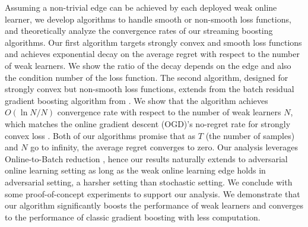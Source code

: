 Assuming a non-trivial edge can be achieved by each deployed weak online learner, we develop algorithms to handle smooth or non-smooth loss functions, and theoretically analyze the convergence rates of our streaming boosting algorithms. Our first algorithm targets strongly convex and smooth loss functions and achieves exponential decay on the average regret with respect to the number of weak learners. We show the ratio of the decay depends on the edge and also the condition number of the loss function. The second algorithm, designed for strongly convex but non-smooth loss functions, extends from the batch residual gradient boosting algorithm from \citep{grubb2011generalized}. We show that the algorithm achieves $O(\ln N/N)$ convergence rate with respect to the number of weak learners $N$, which matches the online gradient descent (OGD)'s no-regret rate for strongly convex loss \citep{hazan2007logarithmic}.  Both of our algorithms promise that as $T$ (the number of samples) and $N$ go to infinity, the average regret converges to zero. Our analysis leverages Online-to-Batch reduction \citep{cesa2004generalization,JMLR:v15:hazan14a}, hence our results naturally extends to adversarial online learning setting as long as the weak online learning edge holds in adversarial setting, a harsher setting than stochastic setting. We conclude with some proof-of-concept experiments to support our analysis. We demonstrate that our algorithm significantly boosts the performance of weak learners and converges to the performance of classic gradient boosting with less computation.  



